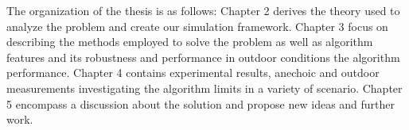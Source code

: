 The organization of the thesis is as follows: Chapter 2 derives the theory used to analyze the problem and create our simulation framework. Chapter 3 focus on describing the methods employed to solve the problem as well as algorithm features and its robustness and performance in outdoor conditions the algorithm performance.
Chapter 4 contains experimental results, anechoic and outdoor measurements investigating the algorithm limits in a variety of scenario.
Chapter 5 encompass a discussion about the solution and propose new ideas and further work.





